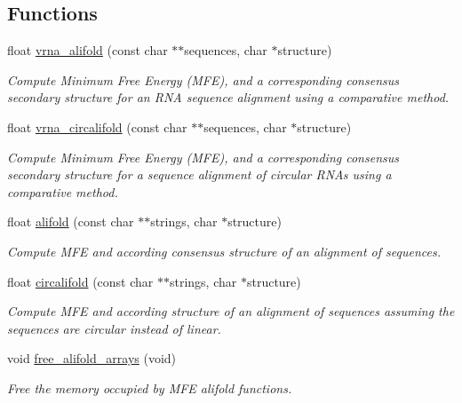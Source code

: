 \subsection*{Functions}
\begin{DoxyCompactItemize}
\item 
float \mbox{\hyperlink{group__consensus__mfe__fold_ga6c9d3bef3e92c6d423ffac9f981418c1}{vrna\+\_\+alifold}} (const char $\ast$$\ast$sequences, char $\ast$structure)
\begin{DoxyCompactList}\small\item\em Compute Minimum Free Energy (M\+FE), and a corresponding consensus secondary structure for an R\+NA sequence alignment using a comparative method. \end{DoxyCompactList}\item 
float \mbox{\hyperlink{group__consensus__mfe__fold_ga17a1be7490468c29c335ba9bffacba53}{vrna\+\_\+circalifold}} (const char $\ast$$\ast$sequences, char $\ast$structure)
\begin{DoxyCompactList}\small\item\em Compute Minimum Free Energy (M\+FE), and a corresponding consensus secondary structure for a sequence alignment of circular R\+N\+As using a comparative method. \end{DoxyCompactList}\item 
float \mbox{\hyperlink{group__consensus__mfe__fold_ga4cf00f0659e5f0480335d69e797f05b1}{alifold}} (const char $\ast$$\ast$strings, char $\ast$structure)
\begin{DoxyCompactList}\small\item\em Compute M\+FE and according consensus structure of an alignment of sequences. \end{DoxyCompactList}\item 
float \mbox{\hyperlink{group__consensus__mfe__fold_gadbd3b0b1c144cbfb4efe704b2b260f96}{circalifold}} (const char $\ast$$\ast$strings, char $\ast$structure)
\begin{DoxyCompactList}\small\item\em Compute M\+FE and according structure of an alignment of sequences assuming the sequences are circular instead of linear. \end{DoxyCompactList}\item 
void \mbox{\hyperlink{group__consensus__mfe__fold_ga72095e4554b5d577250ea14c42acc49e}{free\+\_\+alifold\+\_\+arrays}} (void)
\begin{DoxyCompactList}\small\item\em Free the memory occupied by M\+FE alifold functions. \end{DoxyCompactList}\end{DoxyCompactItemize}


